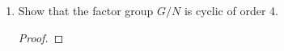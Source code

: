 \documentclass[paper=usletter, fontsize=12pt]{article}
\begin{document}
\begin{itemize}
\begin{enumerate}
\begin{enumerate}
\begin{proof}
                \end{proof}

                \item Show that the factor group $G/N$ is cyclic of order 4.
                \begin{proof}
                \end{proof}

            \end{enumerate}

        \end{enumerate}


    \end{itemize}
\end{document}
